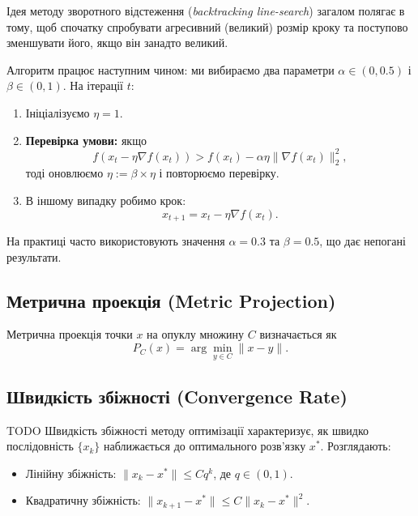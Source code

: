 \documentclass[a4paper,12pt]{article}
\begin{document}
Ідея методу зворотного відстеження (\textit{backtracking line-search}) загалом полягає в тому, щоб спочатку спробувати агресивний (великий) розмір кроку та поступово зменшувати його, якщо він занадто великий.

Алгоритм працює наступним чином: ми вибираємо два параметри $\alpha \in (0, 0.5)$ і $\beta \in (0, 1)$. На ітерації $t$:

\begin{enumerate}
    \item Ініціалізуємо $\eta = 1$.
    \item \textbf{Перевірка умови:} якщо 
    \[
    f(x_t - \eta \nabla f(x_t)) > f(x_t) - \alpha \eta \|\nabla f(x_t)\|_2^2,
    \]
    тоді оновлюємо $\eta := \beta \times \eta$ і повторюємо перевірку.
    \item В іншому випадку робимо крок:
    \[
    x_{t+1} = x_t - \eta \nabla f(x_t).
    \]
\end{enumerate}

На практиці часто використовують значення $\alpha = 0.3$ та $\beta = 0.5$, що дає непогані результати.



\subsection{Метрична проекція (Metric Projection)}
Метрична проекція точки $x$ на опуклу множину $C$ визначається як
\begin{equation}
    P_C(x) = \arg\min_{y \in C} \|x - y\|.
\end{equation}

\subsection{Швидкість збіжності (Convergence Rate)} TODO
Швидкість збіжності методу оптимізації характеризує, як швидко послідовність $\{x_k\}$ наближається до оптимального розв’язку $x^*$. Розглядають:
\begin{itemize}
    \item Лінійну збіжність: $\|x_k - x^*\| \leq C q^k$, де $q \in (0,1)$.
    \item Квадратичну збіжність: $\|x_{k+1} - x^*\| \leq C \|x_k - x^*\|^2$.
\end{itemize}
\end{document}
